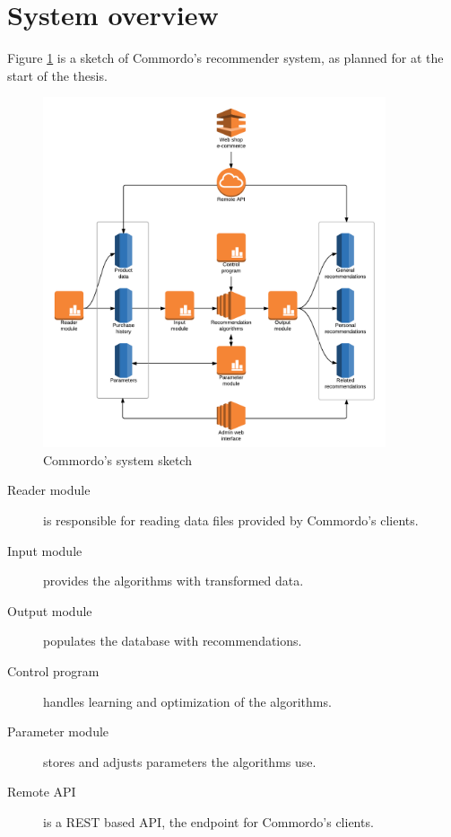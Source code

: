 \section{System overview}\label{sec:sysoverview}

Figure \ref{fig:sysoverview} is a sketch of Commordo's recommender system, as planned for at the start of the thesis.

\begin{figure}[h!]
  \centering
    \includegraphics[width=0.9\textwidth]{fig/system_overview.png}
  \caption{Commordo's system sketch}
  \label{fig:sysoverview}
\end{figure}

\FloatBarrier

\begin{description}
    \item[Reader module] is responsible for reading data files provided by Commordo's clients.
    \item[Input module] provides the algorithms with transformed data.
    \item[Output module] populates the database with recommendations.
    \item[Control program] handles learning and optimization of the algorithms.
    \item[Parameter module] stores and adjusts parameters the algorithms use.
    \item[Remote API] is a REST based API, the endpoint for Commordo's clients.
\end{description}

